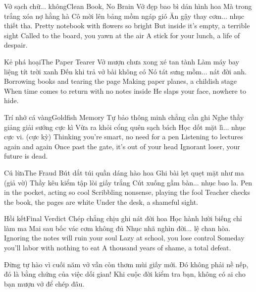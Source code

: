 \begin{tutuyetbox}{Vở sạch chữ... không}{Clean Book, No Brain}
Vở đẹp bao bì dán hình hoa
Mà trong trắng xóa nợ hằng hà
Cô mời lên bảng mồm ngáp gió
Ăn gậy thay cơm... nhục thiết tha.
\tcblower
Pretty notebook with flowers so bright
But inside it's empty, a terrible sight
Called to the board, you yawn at the air
A stick for your lunch, a life of despair.
\end{tutuyetbox}

\begin{tutuyetbox}{Kẻ phá hoại}{The Paper Tearer}
Vở mượn chưa xong xé tan tành
Làm máy bay liệng tít trời xanh
Đến khi trả vở bài không có
Nó tát sưng mồm... nát đời anh.
\tcblower
Borrowing books and tearing the page
Making paper planes, a childish stage
When time comes to return with no notes inside
He slaps your face, nowhere to hide.
\end{tutuyetbox}

\begin{tutuyetbox}{Trí nhớ cá vàng}{Goldfish Memory}
Tự bảo thông minh chẳng cần ghi
Nghe thầy giảng giải sướng cực kì
Vừa ra khỏi cổng quên sạch bách
Học dốt mặt lì... nhục cực vi. (cực kỳ)
\tcblower
Thinking you're smart, no need for a pen
Listening to lectures again and again
Once past the gate, it's out of your head
Ignorant loser, your future is dead.
\end{tutuyetbox}

\begin{tutuyetbox}{Cú lừa}{The Fraud}
Bút dắt túi quần dáng hào hoa
Ghi bài lẹt quẹt mặt như ma (giả vờ)
Thầy kêu kiểm tập lòi giấy trắng
Cút xuống gầm bàn... nhục bao la.
\tcblower
Pen in the pocket, acting so cool
Scribbling nonsense, playing the fool
Teacher checks the book, the pages are white
Under the desk, a shameful sight.
\end{tutuyetbox}

\begin{tutuyetbox}{Hồi kết}{Final Verdict}
Chép chẳng chịu ghi nát đời hoa
Học hành lười biếng chỉ làm ma
Mai sau bốc vác cơm không đủ
Nhục nhã nghìn đời... lệ chan hòa.
\tcblower
Ignoring the notes will ruin your soul
Lazy at school, you lose control
Someday you'll labor with nothing to eat
A thousand years of shame, a total defeat.
\end{tutuyetbox}

\begin{ghichu}
Đừng tự hào vì cuối năm vở vẫn còn thơm mùi giấy mới. Đó không phải nề nếp, đó là bằng chứng của việc dối gian! Khi cuộc đời kiểm tra bạn, không có ai cho bạn mượn vở để chép đâu.
\end{ghichu}